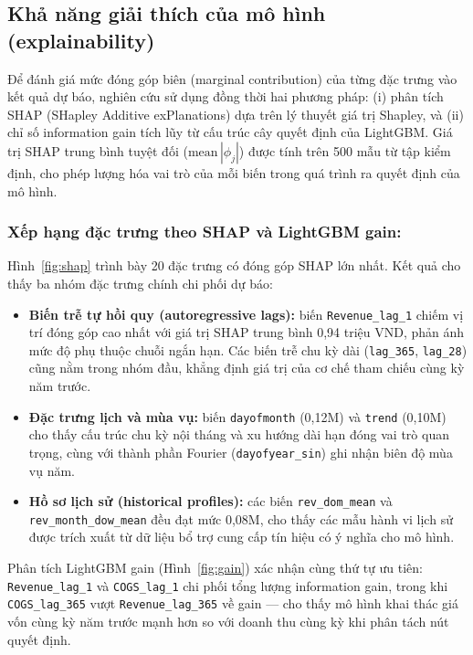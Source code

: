 \documentclass{article}
\begin{document}
\subsection{Khả năng giải thích của mô hình (explainability)}
\label{sec:explainability}

Để đánh giá mức đóng góp biên (marginal contribution) của từng đặc trưng vào kết quả dự báo, nghiên cứu sử dụng đồng thời hai phương pháp: (i) phân tích SHAP (SHapley Additive exPlanations) dựa trên lý thuyết giá trị Shapley, và (ii) chỉ số information gain tích lũy từ cấu trúc cây quyết định của LightGBM. Giá trị SHAP trung bình tuyệt đối ($\text{mean}\,|\phi_j|$) được tính trên 500 mẫu từ tập kiểm định, cho phép lượng hóa vai trò của mỗi biến trong quá trình ra quyết định của mô hình.

\subsubsection{Xếp hạng đặc trưng theo SHAP và LightGBM gain:}
Hình~\ref{fig:shap} trình bày 20 đặc trưng có đóng góp SHAP lớn nhất. Kết quả cho thấy ba nhóm đặc trưng chính chi phối dự báo:

\begin{itemize}[noitemsep,leftmargin=1.2em]
    \item \textbf{Biến trễ tự hồi quy (autoregressive lags):} biến \texttt{Revenue\_lag\_1} chiếm vị trí đóng góp cao nhất với giá trị SHAP trung bình 0,94 triệu VND, phản ánh mức độ phụ thuộc chuỗi ngắn hạn. Các biến trễ chu kỳ dài (\texttt{lag\_365}, \texttt{lag\_28}) cũng nằm trong nhóm đầu, khẳng định giá trị của cơ chế tham chiếu cùng kỳ năm trước.
    \item \textbf{Đặc trưng lịch và mùa vụ:} biến \texttt{dayofmonth} (0,12M) và \texttt{trend} (0,10M) cho thấy cấu trúc chu kỳ nội tháng và xu hướng dài hạn đóng vai trò quan trọng, cùng với thành phần Fourier (\texttt{dayofyear\_sin}) ghi nhận biên độ mùa vụ năm.
    \item \textbf{Hồ sơ lịch sử (historical profiles):} các biến \texttt{rev\_dom\_mean} và \texttt{rev\_month\_dow\_mean} đều đạt mức 0,08M, cho thấy các mẫu hành vi lịch sử được trích xuất từ dữ liệu bổ trợ cung cấp tín hiệu có ý nghĩa cho mô hình.
\end{itemize}

Phân tích LightGBM gain (Hình~\ref{fig:gain}) xác nhận cùng thứ tự ưu tiên: \texttt{Revenue\_lag\_1} và \texttt{COGS\_lag\_1} chi phối tổng lượng information gain, trong khi \texttt{COGS\_lag\_365} vượt \texttt{Revenue\_lag\_365} về gain --- cho thấy mô hình khai thác giá vốn cùng kỳ năm trước mạnh hơn so với doanh thu cùng kỳ khi phân tách nút quyết định.
\end{document}
